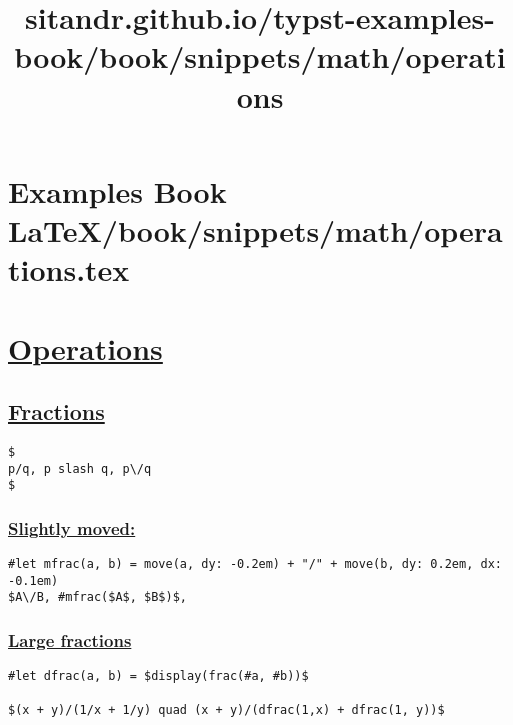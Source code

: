 \pandocbounded{}


\section{Examples Book LaTeX/book/snippets/math/operations.tex}
\title{sitandr.github.io/typst-examples-book/book/snippets/math/operations}

\section{\texorpdfstring{\hyperref[operations]{Operations}}{Operations}}\label{operations}

\subsection{\texorpdfstring{\hyperref[fractions]{Fractions}}{Fractions}}\label{fractions}

\begin{verbatim}
$
p/q, p slash q, p\/q
$
\end{verbatim}

\pandocbounded{}

\subsubsection{\texorpdfstring{\hyperref[slightly-moved]{Slightly
moved:}}{Slightly moved:}}\label{slightly-moved}

\begin{verbatim}
#let mfrac(a, b) = move(a, dy: -0.2em) + "/" + move(b, dy: 0.2em, dx: -0.1em)
$A\/B, #mfrac($A$, $B$)$,
\end{verbatim}

\pandocbounded{}

\subsubsection{\texorpdfstring{\hyperref[large-fractions]{Large
fractions}}{Large fractions}}\label{large-fractions}

\begin{verbatim}
#let dfrac(a, b) = $display(frac(#a, #b))$

$(x + y)/(1/x + 1/y) quad (x + y)/(dfrac(1,x) + dfrac(1, y))$
\end{verbatim}


